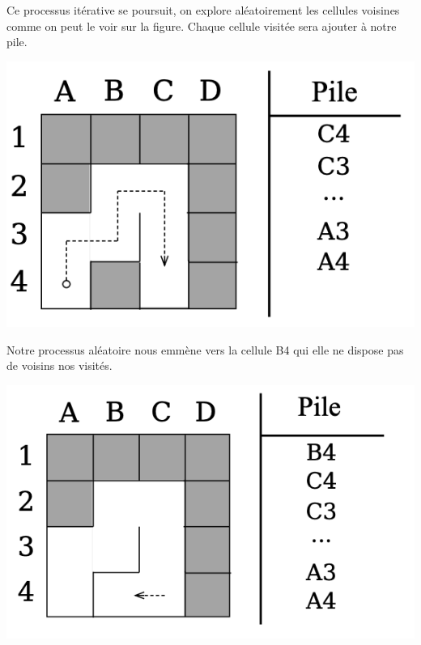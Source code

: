 \newpage

\begin{minipage}{0.6\textwidth}
Ce processus itérative se poursuit, on explore aléatoirement les cellules voisines comme on peut le voir sur la figure. Chaque cellule visitée sera ajouter à notre pile.
\end{minipage}
\begin{minipage}{0.4\textwidth}
\includegraphics[width=\linewidth]{pics/backtracking3.png}
\end{minipage}



\begin{minipage}{0.6\textwidth}
Notre processus aléatoire nous emmène vers la cellule B4 qui elle ne dispose pas de voisins nos visités.
\end{minipage}
\begin{minipage}{0.4\textwidth}
\includegraphics[width=\linewidth]{pics/backtracking4.png}
\end{minipage}


